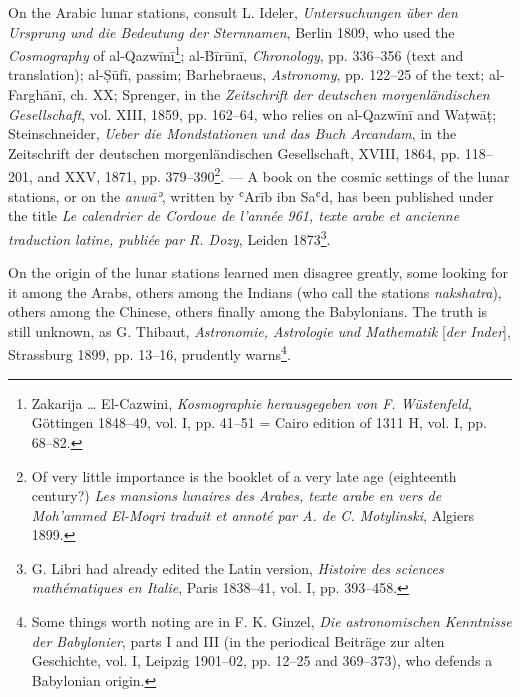 \documentclass[11pt]{article}
\begin{document}
\par On the Arabic lunar stations, consult L. Ideler, \emph{Untersuchungen über den Ursprung und die Bedeutung der Sternnamen}, Berlin 1809, who used the \emph{Cosmography} of al-Qazwīnī\footnote{Zakarija … El-Cazwini, \emph{Kosmographie herausgegeben von F. Wüstenfeld}, Göttingen 1848–49, vol. I, pp. 41–51 = Cairo edition of 1311 H, vol. I, pp. 68–82.}; al-Bīrūnī, \emph{Chronology}, pp. 336–356 (text and translation); al-Ṣūfī, passim; Barhebraeus, \emph{Astronomy}, pp. 122–25 of the text; al-Farghānī, ch. XX; Sprenger, in the \emph{Zeitschrift der deutschen morgenländischen Gesellschaft}, vol. XIII, 1859, pp. 162–64, who relies on al-Qazwīnī and Waṭwāṭ; Steinschneider, \emph{Ueber die Mondstationen und das Buch Arcandam}, in the Zeitschrift der deutschen morgenländischen Gesellschaft, XVIII, 1864, pp. 118–201, and XXV, 1871, pp. 379–390\footnote{Of very little importance is the booklet of a very late age (eighteenth century?) \emph{Les mansions lunaires des Arabes, texte arabe en vers de Moh’ammed El-Moqri traduit et annoté par A. de C. Motylinski}, Algiers 1899.}. — A book on the cosmic settings of the lunar stations, or on the \emph{anwāʾ}, written by ʿArīb ibn Saʿd, has been published under the title \emph{Le calendrier de Cordoue de l'année 961, texte arabe et ancienne traduction latine, publiée par R. Dozy}, Leiden 1873\footnote{G. Libri had already edited the Latin version, \emph{Histoire des sciences mathématiques en Italie}, Paris 1838–41, vol. I, pp. 393–458.}.\par
\par On the origin of the lunar stations learned men disagree greatly, some looking for it among the Arabs, others among the Indians (who call the stations \emph{nakshatra}), others among the Chinese, others finally among the Babylonians. The truth is still unknown, as G. Thibaut, \emph{Astronomie, Astrologie und Mathematik} [\emph{der Inder}], Strassburg 1899, pp. 13–16, prudently warns\footnote{Some things worth noting are in F. K. Ginzel, \emph{Die astronomischen Kenntnisse der Babylonier}, parts I and III (in the periodical Beiträge zur alten Geschichte, vol. I, Leipzig 1901–02, pp. 12–25 and 369–373), who defends a Babylonian origin.}.\par
\end{document}
